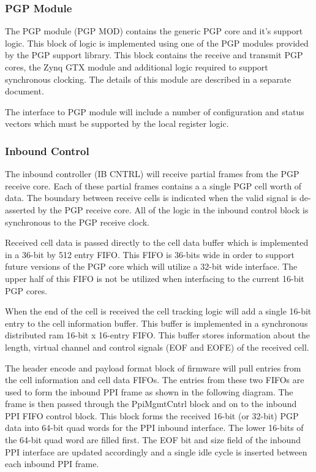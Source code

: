 \documentclass[11pt]{article}
\begin{document}
\subsubsection{PGP Module}

The PGP module (PGP MOD) contains the generic PGP core and it's support logic. This block of logic is implemented using one of the
PGP modules provided by the PGP support library. This block contains the receive and transmit PGP cores, the Zynq GTX module 
and additional logic required to support synchronous clocking. The details of this module are described in a separate
document. 

The interface to PGP module will include a number of configuration and status vectors which must be supported by the local register logic.

\subsubsection{Inbound Control}

The inbound controller (IB CNTRL) will receive partial frames from the PGP receive core. Each of these partial frames contains a 
a single PGP cell worth of data. The boundary between receive cells is indicated when the valid signal is 
de-asserted by the PGP receive core. All of the logic in the inbound control block is synchronous to the PGP receive clock.

Received cell data is passed directly to the cell data buffer which is implemented in a 36-bit by 512 entry FIFO. This FIFO
is 36-bits wide in order to support future versions of the PGP core which will utilize a 32-bit wide interface. The upper half of this 
FIFO is not be utilized when interfacing to the current 16-bit PGP cores.

When the end of the cell is received the cell tracking logic will add a single 16-bit entry to the cell information buffer. This buffer is
implemented in a synchronous distributed ram 16-bit x 16-entry FIFO. This buffer stores information about the length, virtual channel
and control signals (EOF and EOFE) of the received cell. 

The header encode and payload format block of firmware will pull entries from the cell information and cell data FIFOs. The entries from
these two FIFOs are used to form the inbound PPI frame as shown in the following diagram. The frame is then passed through the PpiMgmtCntrl 
block and on to the inbound PPI FIFO control block. This block forms the received 16-bit (or 32-bit) PGP data into 64-bit quad words for
the PPI inbound interface.  The lower 16-bits of the 64-bit quad word are filled first. The EOF bit and size field of the inbound PPI 
interface are updated accordingly and a single idle cycle is inserted between each inbound PPI frame.
\end{document}
